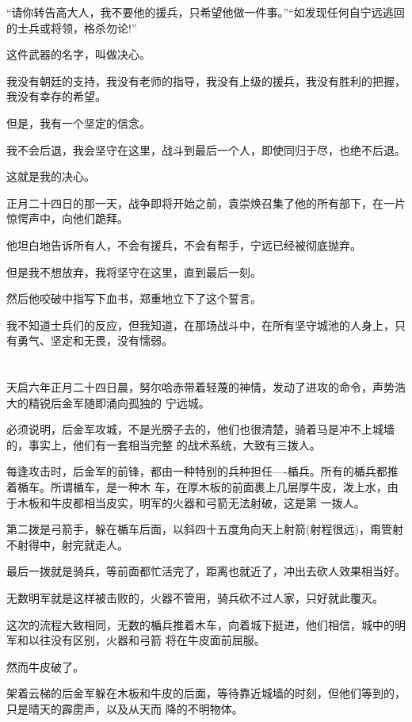 \documentclass[11pt,a4paper,onecolumn]{article}
\begin{document}
``请你转告高大人，我不要他的援兵，只希望他做一件事。''``如发现任何自宁远逃回的士兵或将领，格杀勿论!''

这件武器的名字，叫做决心。

我没有朝廷的支持，我没有老师的指导，我没有上级的援兵，我没有胜利的把握，我没有幸存的希望。

但是，我有一个坚定的信念。

我不会后退，我会坚守在这里，战斗到最后一个人，即使同归于尽，也绝不后退。

这就是我的决心。

正月二十四日的那一天，战争即将开始之前，袁崇焕召集了他的所有部下，在一片惊愕声中，向他们跪拜。

他坦白地告诉所有人，不会有援兵，不会有帮手，宁远已经被彻底抛弃。

但是我不想放弃，我将坚守在这里，直到最后一刻。

然后他咬破中指写下血书，郑重地立下了这个誓言。

我不知道士兵们的反应，但我知道，在那场战斗中，在所有坚守城池的人身上，只有勇气、坚定和无畏，没有懦弱。

\section[\thesection]{}

天启六年正月二十四日晨，努尔哈赤带着轻蔑的神情，发动了进攻的命令，声势浩大的精锐后金军随即涌向孤独的
宁远城。

必须说明，后金军攻城，不是光膀子去的，他们也很清楚，骑着马是冲不上城墙的，事实上，他们有一套相当完整
的战术系统，大致有三拨人。

每逢攻击时，后金军的前锋，都由一种特别的兵种担任----楯兵。所有的楯兵都推着楯车。所谓楯车，是一种木
车，在厚木板的前面裹上几层厚牛皮，泼上水，由于木板和牛皮都相当皮实，明军的火器和弓箭无法射破，这是第
一拨人。

第二拨是弓箭手，躲在楯车后面，以斜四十五度角向天上射箭(射程很远)，甭管射不射得中，射完就走人。

最后一拨就是骑兵，等前面都忙活完了，距离也就近了，冲出去砍人效果相当好。

无数明军就是这样被击败的，火器不管用，骑兵砍不过人家，只好就此覆灭。

这次的流程大致相同，无数的楯兵推着木车，向着城下挺进，他们相信，城中的明军和以往没有区别，火器和弓箭
将在牛皮面前屈服。

然而牛皮破了。

架着云梯的后金军躲在木板和牛皮的后面，等待靠近城墙的时刻，但他们等到的，只是晴天的霹雳声，以及从天而
降的不明物体。
\end{document}
